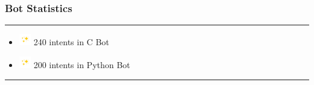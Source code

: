 \documentclass[14pt]{beamer}
\begin{document}
\begin{frame}
    \frametitle{Bot Statistics}
    \noindent
    {\color{pink} \rule{\linewidth}{0.7mm} }
	\begin{itemize} 
         \item [] \includegraphics[width=0.2in, height=0.2in]{./logos/sparkle.jpg} 240 intents in C Bot\\
             \pause
         \item [] \includegraphics[width=0.2in, height=0.2in]{./logos/sparkle.jpg} 200 intents in Python Bot\\
    \end{itemize}
    \noindent
    {\color{pink} \rule{\linewidth}{0.7mm} }
\end{frame}
\end{document}
